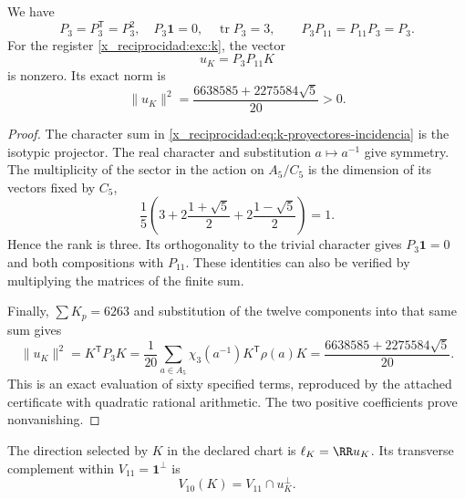 \begin{lemma}
\label{x_reciprocidad:lem:k-sector-no-nulo}
We have
\[
 P_3=P_3^{\mathsf T}=P_3^2,\quad
 P_3\mathbf1=0,\quad \operatorname{tr}P_3=3,
 \qquad P_3P_{11}=P_{11}P_3=P_3.
\]
For the register \eqref{x_reciprocidad:exc:k}, the vector
\begin{equation}
 u_K=P_3P_{11}K
 \label{x_reciprocidad:eq:k-vector-direccional}
\end{equation}
is nonzero. Its exact norm is
\begin{equation}
 \lVert u_K\rVert^2
 =\frac{6638585+2275584\sqrt5}{20}>0.
 \label{x_reciprocidad:eq:k-norma-direccion}
\end{equation}
\end{lemma}
\begin{proof}
The character sum in \eqref{x_reciprocidad:eq:k-proyectores-incidencia} is the
isotypic projector. The real character and substitution \(a\mapsto a^{-1}\)
give symmetry. The multiplicity of the sector in the action on
\(A_5/C_5\) is the dimension of its vectors fixed by \(C_5\),
\[
 \frac15\left(3+2\frac{1+\sqrt5}{2}
                 +2\frac{1-\sqrt5}{2}\right)=1.
\]
Hence the rank is three. Its orthogonality to the trivial character
gives \(P_3\mathbf1=0\) and both compositions with \(P_{11}\).
These identities can also be verified by multiplying the
matrices of the finite sum.

Finally, \(\sum K_p=6263\) and substitution of the twelve
components into that same sum gives
\[
 \lVert u_K\rVert^2=K^{\mathsf T}P_3K
 =\frac1{20}\sum_{a\in A_5}
                \chi_3(a^{-1})K^{\mathsf T}\rho(a)K
 =\frac{6638585+2275584\sqrt5}{20}.
\]
This is an exact evaluation of sixty specified terms,
reproduced by the attached certificate with quadratic rational
arithmetic. The two positive coefficients prove nonvanishing.
\end{proof}

\begin{definition}
The direction selected by \(K\) in the declared chart is
\(\ell_K=\RR u_K\). Its transverse complement within
\(V_{11}=\mathbf1^\perp\) is
\[
 V_{10}(K)=V_{11}\cap u_K^\perp.
\]
\end{definition}

